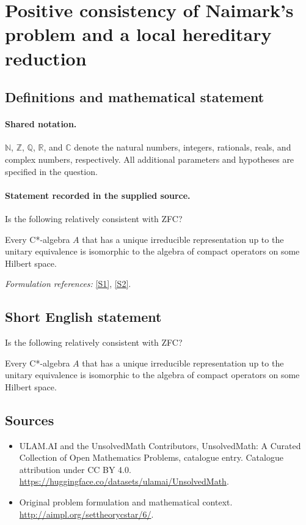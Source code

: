 \documentclass[11pt]{article}
\newcommand{\sref}[2]{\hyperlink{source:#1:#2}{[S#2]}}
\begin{document}
\section{Positive consistency of Naimark's problem and a local hereditary reduction}\label{statement}

\subsection{Definitions and mathematical statement}

\paragraph{Shared notation.}$\mathbb N$, $\mathbb Z$, $\mathbb Q$, $\mathbb R$, and $\mathbb C$ denote the natural numbers, integers, rationals, reals, and complex numbers, respectively. All additional parameters and hypotheses are specified in the question.


\paragraph{Statement recorded in the supplied source.}
Is the following relatively consistent with ZFC?

Every C*-algebra $A$ that has a unique irreducible representation up to the
unitary equivalence is isomorphic to the algebra of compact operators on some
Hilbert space.
\par\smallskip\textit{Formulation references:} \sref{statement}{1}, \sref{statement}{2}.
\subsection{Short English statement}
Is the following relatively consistent with ZFC?

Every C*-algebra $A$ that has a unique irreducible representation up to the
unitary equivalence is isomorphic to the algebra of compact operators on some
Hilbert space.
\subsection{Sources}
\begin{itemize}
\item[\hypertarget{source:statement:1}{S1}] ULAM.AI and the UnsolvedMath Contributors, UnsolvedMath: A Curated Collection of Open Mathematics Problems, catalogue entry. Catalogue attribution under CC BY 4.0.
\url{https://huggingface.co/datasets/ulamai/UnsolvedMath}.
\item[\hypertarget{source:statement:2}{S2}] Original problem formulation and mathematical context.
\url{http://aimpl.org/settheorycstar/6/}.
\end{itemize}
\label{end:statement}
\end{document}
